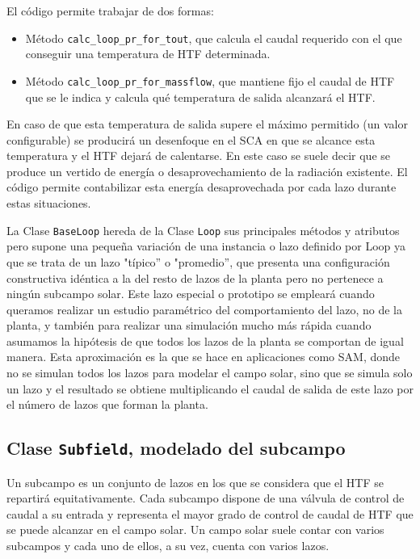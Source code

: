 El código permite trabajar de dos formas: 

\begin{itemize}
\item
Método \texttt{calc\_loop\_pr\_for\_tout}, que calcula el caudal requerido con el que conseguir una temperatura de HTF determinada.
\item
Método \texttt{calc\_loop\_pr\_for\_massflow}, que  mantiene fijo el caudal de HTF que se le indica y calcula qué temperatura de salida alcanzará el HTF. 
\end{itemize}

En caso de que esta temperatura de salida supere el máximo permitido (un valor configurable) se producirá un desenfoque en el SCA en que se alcance esta temperatura y el HTF dejará de calentarse. En este caso se suele decir que se produce un vertido de energía o desaprovechamiento de la radiación existente. El código permite contabilizar esta energía desaprovechada por cada lazo durante estas situaciones.

La Clase \texttt{BaseLoop} hereda de la Clase \texttt{Loop} sus principales métodos y atributos pero supone una pequeña variación de una instancia o lazo definido por Loop ya que se trata de un lazo  "típico'' o "promedio'', que presenta una configuración constructiva idéntica a la del resto de lazos de la planta pero no pertenece a ningún subcampo solar. Este lazo especial o prototipo se empleará cuando queramos realizar un estudio paramétrico del comportamiento del lazo, no de la planta, y también para realizar una simulación mucho más rápida cuando asumamos la hipótesis de que todos los lazos de la planta se comportan de igual manera. Esta aproximación es la que se hace en aplicaciones como SAM, donde no se simulan todos los lazos para modelar el campo solar, sino que se simula solo un lazo y el resultado se obtiene multiplicando el caudal de salida de este lazo por el número de lazos que forman la planta. 

\subsection{Clase \texttt{Subfield}, modelado del subcampo}
\label{subfield}

Un subcampo es un conjunto de lazos en los que se considera que el HTF se repartirá equitativamente. Cada subcampo dispone de una válvula de control de caudal a su entrada y representa el mayor grado de control de caudal de HTF que se puede alcanzar en el campo solar. Un campo solar suele contar con varios subcampos y cada uno de ellos, a su vez, cuenta con varios lazos.  

